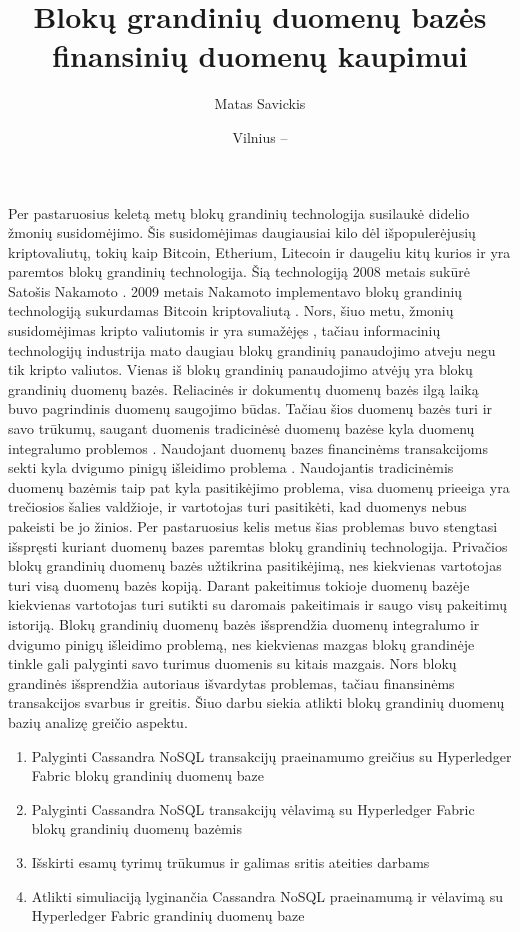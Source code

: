 \documentclass{VUMIFPSkursinis}
\title{Blokų grandinių duomenų bazės finansinių duomenų kaupimui}
\author{Matas Savickis}
\date{Vilnius – \the\year}
\begin{document}
\maketitle

\tableofcontents

Per pastaruosius keletą metų blokų grandinių technologija susilaukė didelio žmonių susidomėjimo. 
Šis susidomėjimas daugiausiai kilo dėl išpopulerėjusių kriptovaliutų, tokių kaip Bitcoin, Etherium, Litecoin ir daugeliu kitų 
kurios ir yra paremtos blokų grandinių technologija. Šią technologiją 2008 metais sukūrė Satošis Nakamoto  \cite{BlockChain}. 
2009 metais Nakamoto implementavo blokų grandinių technologiją sukurdamas Bitcoin kriptovaliutą \cite{Bitcoin}. 
Nors, šiuo metu, žmonių susidomėjimas kripto valiutomis ir yra sumažėjęs \cite{Trends}, tačiau informacinių technologijų industrija 
mato daugiau blokų grandinių panaudojimo atveju negu tik kripto valiutos. Vienas iš blokų grandinių panaudojimo atvėjų yra 
blokų grandinių duomenų bazės. Reliacinės ir dokumentų duomenų bazės ilgą laiką buvo pagrindinis duomenų saugojimo būdas. 
Tačiau šios duomenų bazės turi ir savo trūkumų, saugant duomenis tradicinėsė duomenų bazėse kyla duomenų integralumo problemos \cite{Integrity}
. 
Naudojant duomenų bazes financinėms transakcijoms sekti kyla dvigumo pinigų išleidimo problema\cite{Double}
. Naudojantis tradicinėmis duomenų bazėmis 
taip pat kyla pasitikėjimo problema, visa duomenų prieeiga yra trečiosios šalies valdžioje, ir vartotojas turi pasitikėti, kad duomenys nebus pakeisti be jo žinios.
Per pastaruosius kelis metus šias problemas
 buvo stengtasi išspręsti kuriant duomenų bazes paremtas blokų grandinių technologija. Privačios blokų grandinių duomenų bazės užtikrina pasitikėjimą, nes kiekvienas vartotojas turi visą duomenų 
bazės kopiją. Darant pakeitimus tokioje duomenų bazėje kiekvienas vartotojas turi sutikti su daromais pakeitimais ir saugo visų pakeitimų istoriją. Blokų grandinių duomenų bazės išsprendžia duomenų integralumo ir
dvigumo pinigų išleidimo problemą, nes kiekvienas mazgas blokų grandinėje tinkle gali palyginti savo turimus duomenis su kitais mazgais. 
Nors blokų grandinės išsprendžia autoriaus išvardytas problemas, tačiau finansinėms transakcijos svarbus ir greitis. Šiuo darbu siekia atlikti blokų grandinių duomenų bazių analizę greičio aspektu.

	\begin{enumerate}
		\item{Palyginti Cassandra NoSQL transakcijų praeinamumo greičius su Hyperledger Fabric blokų grandinių duomenų baze}
		\item{Palyginti Cassandra NoSQL transakcijų vėlavimą su Hyperledger Fabric blokų grandinių duomenų bazėmis}
		\item{Išskirti esamų tyrimų trūkumus ir galimas sritis ateities darbams}
		\item{Atlikti simuliaciją lyginančia Cassandra NoSQL praeinamumą ir vėlavimą su Hyperledger Fabric grandinių duomenų baze}
		
	\end{enumerate}
\pagebreak
\end{document}
